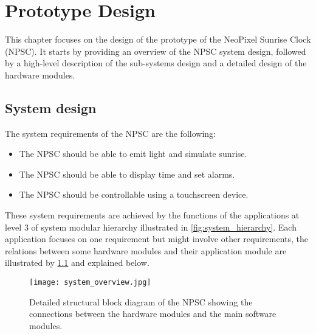 \chapter{Prototype Design}
This chapter focuses on the design of the prototype of the NeoPixel Sunrise Clock (NPSC). It starts by providing an overview of the NPSC system design, followed by a high-level description of the sub-systems design and a detailed design of the hardware modules.

\section{System design}
The system requirements of the NPSC are the following:
\begin{itemize}
\item The NPSC should be able to emit light and simulate sunrise. 
\item The NPSC should be able to display time and set alarms.
\item The NPSC should be controllable using a touchscreen device.
\end{itemize}
These system requirements are achieved by the functions of the applications at level 3 of system modular hierarchy illustrated in \cref{fig:system_hierarchy}. Each application focuses on one requirement but might involve other requirements, the relations between some hardware modules and their application module are illustrated by \cref{fig:system_overview} and explained below.
\begin{figure}[ht]
\centering
\texttt{[image: system\_overview.jpg]}
\caption{Detailed structural block diagram of the NPSC showing the connections between the hardware modules and the main software modules.}
\label{fig:system_overview}
\end{figure}
